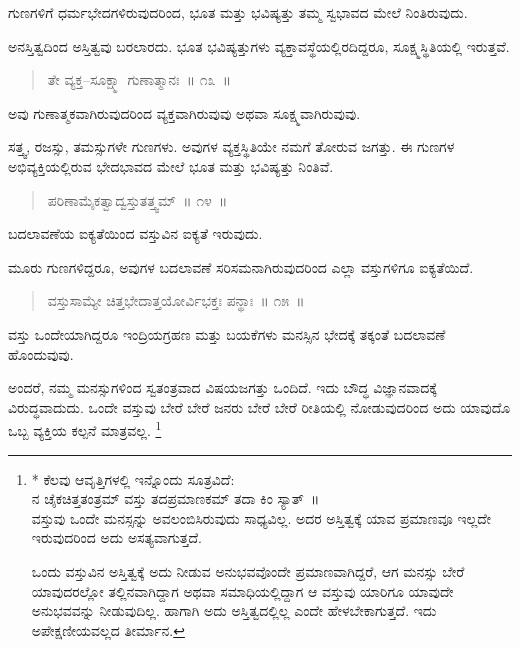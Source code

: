 \vspace{-0.3cm}

ಗುಣಗಳಿಗೆ ಧರ್ಮಭೇದಗಳಿರುವುದರಿಂದ, ಭೂತ ಮತ್ತು ಭವಿಷ್ಯತ್ತು ತಮ್ಮ ಸ್ವಭಾವದ ಮೇಲೆ ನಿಂತಿರುವುದು. 

ಅನಸ್ತಿತ್ವದಿಂದ ಅಸ್ತಿತ್ವವು ಬರಲಾರದು. ಭೂತ ಭವಿಷ್ಯತ್ತುಗಳು ವ್ಯಕ್ತಾವಸ್ಥೆಯಲ್ಲಿರದಿದ್ದರೂ, ಸೂಕ್ಷ್ಮಸ್ಥಿತಿಯಲ್ಲಿ ಇರುತ್ತವೆ. 

\vspace{-0.3cm}

\begin{verse}
ತೇ ವ್ಯಕ್ತ–ಸೂಕ್ಷ್ಮಾ ಗುಣಾತ್ಮಾನಃ~॥ ೧೩~॥
\end{verse}

\vspace{-0.3cm}

ಅವು ಗುಣಾತ್ಮಕವಾಗಿರುವುದರಿಂದ ವ್ಯಕ್ತವಾಗಿರುವುವು ಅಥವಾ ಸೂಕ್ಷ್ಮವಾಗಿರುವುವು. 

ಸತ್ತ್ವ, ರಜಸ್ಸು, ತಮಸ್ಸುಗಳೇ ಗುಣಗಳು. ಅವುಗಳ ವ್ಯಕ್ತಸ್ಥಿತಿಯೇ ನಮಗೆ ತೋರುವ ಜಗತ್ತು. ಈ ಗುಣಗಳ ಅಭಿವ್ಯಕ್ತಿಯಲ್ಲಿರುವ ಭೇದಭಾವದ ಮೇಲೆ ಭೂತ ಮತ್ತು ಭವಿಷ್ಯತ್ತು ನಿಂತಿವೆ. 

\vspace{-0.3cm}

\begin{verse}
ಪರಿಣಾಮೈಕತ್ವಾದ್ವಸ್ತುತತ್ತ್ವಮ್​~॥ ೧೪~॥
\end{verse}

\vspace{-0.3cm}

ಬದಲಾವಣೆಯ ಐಕ್ಯತೆಯಿಂದ ವಸ್ತುವಿನ ಐಕ್ಯತೆ ಇರುವುದು. 

ಮೂರು ಗುಣಗಳಿದ್ದರೂ, ಅವುಗಳ ಬದಲಾವಣೆ ಸರಿಸಮನಾಗಿರುವುದರಿಂದ ಎಲ್ಲಾ ವಸ್ತುಗಳಿಗೂ ಐಕ್ಯತೆಯಿದೆ. 

\vspace{-0.3cm}

\begin{verse}
ವಸ್ತುಸಾಮ್ಯೇ ಚಿತ್ತಭೇದಾತ್ತಯೋರ್ವಿಭಕ್ತಃ ಪನ್ಥಾಃ~॥ ೧೫~॥
\end{verse}

\vspace{-0.3cm}

ವಸ್ತು ಒಂದೇಯಾಗಿದ್ದರೂ ಇಂದ್ರಿಯಗ್ರಹಣ ಮತ್ತು ಬಯಕೆಗಳು ಮನಸ್ಸಿನ ಭೇದಕ್ಕೆ ತಕ್ಕಂತೆ ಬದಲಾವಣೆ ಹೊಂದುವುವು. 

ಅಂದರೆ, ನಮ್ಮ ಮನಸ್ಸುಗಳಿಂದ ಸ್ವತಂತ್ರವಾದ ವಿಷಯಜಗತ್ತು ಒಂದಿದೆ. ಇದು ಬೌದ್ಧ ವಿಜ್ಞಾನವಾದಕ್ಕೆ ವಿರುದ್ಧವಾದುದು. ಒಂದೇ ವಸ್ತುವು ಬೇರೆ ಬೇರೆ ಜನರು ಬೇರೆ ಬೇರೆ ರೀತಿಯಲ್ಲಿ ನೋಡುವುದರಿಂದ ಅದು ಯಾವುದೊ ಒಬ್ಬ ವ್ಯಕ್ತಿಯ ಕಲ್ಪನೆ ಮಾತ್ರವಲ್ಲ. \footnote{* ಕೆಲವು ಆವೃತ್ತಿಗಳಲ್ಲಿ ಇನ್ನೊಂದು ಸೂತ್ರವಿದೆ:\\ನ ಚೈಕಚಿತ್ತತಂತ್ರಮ್​ ವಸ್ತು ತದಪ್ರಮಾಣಕಮ್​ ತದಾ ಕಿಂ ಸ್ಯಾತ್​~॥\\ವಸ್ತುವು ಒಂದೇ ಮನಸ್ಸನ್ನು ಅವಲಂಬಿಸಿರುವುದು ಸಾಧ್ಯವಿಲ್ಲ. ಅದರ ಅಸ್ತಿತ್ವಕ್ಕೆ ಯಾವ ಪ್ರಮಾಣವೂ ಇಲ್ಲದೇ ಇರುವುದರಿಂದ ಅದು ಅಸತ್ಯವಾಗುತ್ತದೆ.

ಒಂದು ವಸ್ತುವಿನ ಅಸ್ತಿತ್ವಕ್ಕೆ ಅದು ನೀಡುವ ಅನುಭವವೊಂದೇ ಪ್ರಮಾಣವಾಗಿದ್ದರೆ, ಆಗ ಮನಸ್ಸು ಬೇರೆ ಯಾವುದರಲ್ಲೋ ತಲ್ಲಿನವಾಗಿದ್ದಾಗ ಅಥವಾ ಸಮಾಧಿಯಲ್ಲಿದ್ದಾಗ ಆ ವಸ್ತುವು ಯಾರಿಗೂ ಯಾವುದೇ ಅನುಭವವನ್ನು ನೀಡುವುದಿಲ್ಲ. ಹಾಗಾಗಿ ಅದು ಅಸ್ತಿತ್ವದಲ್ಲಿಲ್ಲ ಎಂದೇ ಹೇಳಬೇಕಾಗುತ್ತದೆ. ಇದು ಅಪೇಕ್ಷಣೀಯವಲ್ಲದ ತೀರ್ಮಾನ.}

